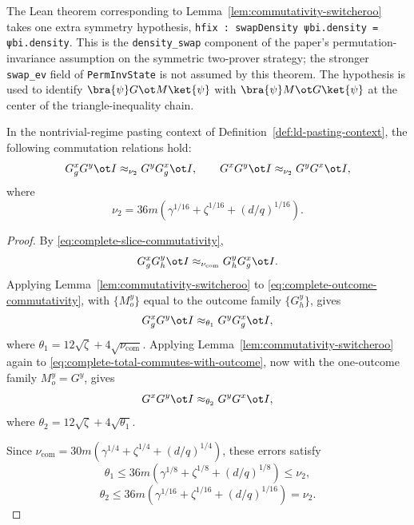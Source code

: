 \begin{remark}\label{rem:commutativity-switcheroo-density-swap}
	The Lean theorem corresponding to Lemma~\ref{lem:commutativity-switcheroo}
	takes one extra symmetry hypothesis,
	\texttt{hfix : swapDensity ψbi.density = ψbi.density}. This is the
	\texttt{density\_swap} component of the paper's permutation-invariance
	assumption on the symmetric two-prover strategy; the stronger
	\texttt{swap\_ev} field of \texttt{PermInvState} is not assumed by this
	theorem. The hypothesis is used to identify
	$\bra{\psi} G \ot M \ket{\psi}$ with $\bra{\psi} M \ot G \ket{\psi}$
	at the center of the triangle-inequality chain.
\end{remark}

\begin{corollary}\label{cor:commuting-with-G-complete}
	\leanok
	In the nontrivial-regime pasting context of Definition~\ref{def:ld-pasting-context},
	the following commutation relations hold:
	\[
		G_g^x G^y \ot I \approx_{\nu_2} G^y G_g^x \ot I,
		\qquad
		G^x G^y \ot I \approx_{\nu_2} G^y G^x \ot I,
	\]
	where
	\[
		\nu_2 = 36m\left(\gamma^{1/16}+\zeta^{1/16}+(d/q)^{1/16}\right).
	\]
\end{corollary}
\begin{proof}
	\leanok
	By \ref{eq:complete-slice-commutativity},
	\begin{equation}\label{eq:complete-outcome-commutativity}
		G_g^x G_h^y \ot I \approx_{\nu_{\mathrm{com}}} G_h^y G_g^x \ot I.
	\end{equation}
	Applying Lemma~\ref{lem:commutativity-switcheroo} to \ref{eq:complete-outcome-commutativity}, with $\{M_o^y\}$ equal to the outcome family $\{G_h^y\}$, gives
	\begin{equation}\label{eq:complete-total-commutes-with-outcome}
		G_g^x G^y \ot I \approx_{\theta_1} G^y G_g^x \ot I,
	\end{equation}
	where $\theta_1 = 12\sqrt{\zeta} + 4\sqrt{\nu_{\mathrm{com}}}$. Applying Lemma~\ref{lem:commutativity-switcheroo} again to \ref{eq:complete-total-commutes-with-outcome}, now with the one-outcome family $M_o^y = G^y$, gives
	\[
		G^x G^y \ot I \approx_{\theta_2} G^y G^x \ot I,
	\]
	where $\theta_2 = 12\sqrt{\zeta} + 4\sqrt{\theta_1}$.

	Since $\nu_{\mathrm{com}}=30m(\gamma^{1/4}+\zeta^{1/4}+(d/q)^{1/4})$, these errors satisfy
	\[
		\theta_1 \le 36m\left(\gamma^{1/8}+\zeta^{1/8}+(d/q)^{1/8}\right)\le \nu_2,
	\]
	\[
		\theta_2 \le 36m\left(\gamma^{1/16}+\zeta^{1/16}+(d/q)^{1/16}\right)=\nu_2.
	\]
\end{proof}

